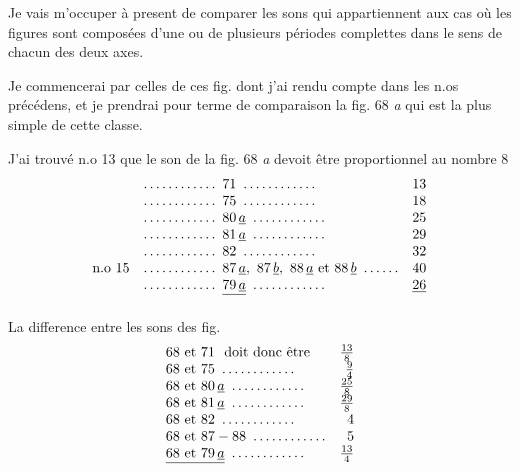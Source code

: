 \documentclass[11pt,a4paper]{article}
\begin{document}
Je vais m'occuper à present de comparer les sons qui appartiennent aux
cas où les figures sont composées d'une ou de plusieurs périodes complettes
dans le sens de chacun des deux axes.

Je commencerai par celles de ces fig. dont j'ai rendu compte dans les n.os précédens,
et je prendrai pour terme de comparaison la fig. 68 \emph{a} qui est la plus
simple de cette classe.

J'ai trouvé n.o 13 que le son de la fig. 68 \emph{a} devoit être proportionnel au nombre 8
\[
\begin{array}{llr}
 & \ldots\ldots\ldots\ldots\ 71\ \ldots\ldots\ldots\ldots & 13\\
 & \ldots\ldots\ldots\ldots\ 75\ \ldots\ldots\ldots\ldots & 18\\
 & \ldots\ldots\ldots\ldots\ 80\,\underline{a}\ \ldots\ldots\ldots\ldots & 25\\
 & \ldots\ldots\ldots\ldots\ 81\,\underline{a}\ \ldots\ldots\ldots\ldots & 29\\
 & \ldots\ldots\ldots\ldots\ 82\ \ldots\ldots\ldots\ldots & 32\\
\text{n.o }15 & \ldots\ldots\ldots\ldots\ 87\,\underline{a},\ 87\,\underline{b},\ 88\,\underline{a} \text{ et } 88\,\underline{b}\ \ldots\ldots & 40\\
 & \ldots\ldots\ldots\ldots\ \struck{79\,\underline{a}}\ \ldots\ldots\ldots\ldots & \struck{26}
\end{array}
\]

La difference entre les sons des fig.
\[
\begin{array}{lr}
68 \text{ et } 71 \ \text{ doit donc être} & \frac{13}{8}\\
68 \text{ et } 75\ \ldots\ldots\ldots\ldots & \frac{9}{4}\\
68 \text{ et } 80\,\underline{a}\ \ldots\ldots\ldots\ldots & \frac{25}{8}\\
68 \text{ et } 81\,\underline{a}\ \ldots\ldots\ldots\ldots & \frac{29}{8}\\
68 \text{ et } 82\ \ldots\ldots\ldots\ldots & 4\\
68 \text{ et } 87-88\ \ldots\ldots\ldots\ldots & 5\\
\struck{68 \text{ et } 79\,\underline{a}}\ \ldots\ldots\ldots\ldots & \frac{13}{4}
\end{array}
\]
\end{document}
